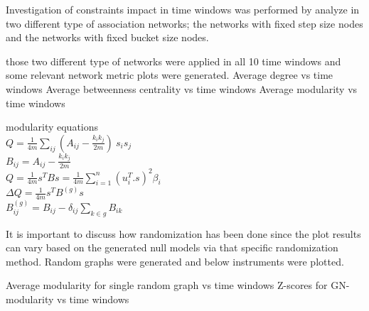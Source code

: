 Investigation of constraints impact in time windows was performed by analyze in two different type of association networks; the networks with fixed step size nodes and the networks with fixed bucket size nodes.

those two different type of networks were applied in all 10 time windows and some relevant network metric plots were generated. 
Average degree vs time windows
Average betweenness centrality vs time windows
Average modularity vs time windows

modularity equations\\
$Q = \frac {1} {4 m}\sum_ {ij} (A_{ij} - \frac {k_{i} k_{j}}{2 m}) \
s_{i} s_{j}$\\
$B_{ij} = A_{ij} - \frac {k_ {i} k_ {j}} {2 m}$\\
$Q = \frac {1} {4 m} s^{T} Bs = \frac {1} {4 m}\sum_ {i = 
	1}^{n} (u_ {i}^{T} . s)^{2}\beta_ {i}$\\
$\Delta Q = \frac {1} {4 m} s^{T} B^{(g)} s$\\
$B_{ij}^{(g)} = B_{ij} - \delta_{ij}\sum_ {k\in g} B_{ik}$

It is important to discuss how randomization has been done since the plot results can vary based on the generated null models via that specific randomization method. 
Random graphs were generated and below instruments were plotted.

Average modularity for single random graph vs time windows
Z-scores for GN-modularity vs time windows